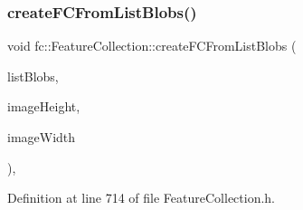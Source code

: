 \subsubsection{\texorpdfstring{create\+F\+C\+From\+List\+Blobs()}{createFCFromListBlobs()}}
{\footnotesize\ttfamily void fc\+::\+Feature\+Collection\+::create\+F\+C\+From\+List\+Blobs (\begin{DoxyParamCaption}\item[{const \hyperlink{structfc_1_1ListBlobs}{List\+Blobs} $\ast$}]{list\+Blobs,  }\item[{uint32\+\_\+t}]{image\+Height,  }\item[{uint32\+\_\+t}]{image\+Width }\end{DoxyParamCaption})\hspace{0.3cm}{\ttfamily [inline]}, {\ttfamily [private]}}



Definition at line 714 of file Feature\+Collection.\+h.

